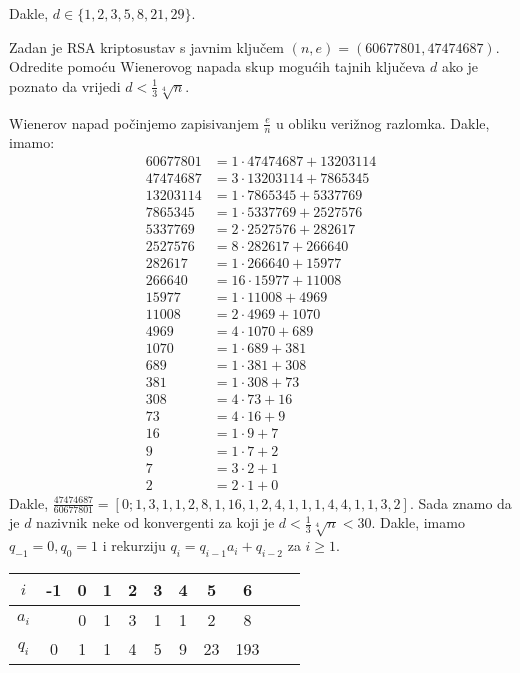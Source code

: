 \documentclass{exam}
\begin{document}
\begin{questions}
\begin{solution}
  Dakle, $d \in \{1, 2, 3, 5, 8, 21, 29\}$.
\end{solution}

\pagebreak

\question Zadan je RSA kriptosustav s javnim ključem $(n, e) = (60677801, 47474687)$. Odredite pomoću Wienerovog napada skup mogućih tajnih ključeva $d$ ako je poznato da vrijedi $d < \frac{1}{3} \sqrt[4]{n}$.

\begin{solution}
  Wienerov napad počinjemo zapisivanjem $\frac{e}{n}$ u obliku verižnog razlomka. Dakle, imamo:
  \begin{align*}
    60677801 &= 1 \cdot 47474687 + 13203114\\
    47474687 &= 3 \cdot 13203114 + 7865345\\
    13203114 &= 1 \cdot 7865345 + 5337769\\
    7865345 &= 1 \cdot 5337769 + 2527576\\
    5337769 &= 2 \cdot 2527576 + 282617\\
    2527576 &= 8 \cdot 282617 + 266640\\
    282617 &= 1 \cdot 266640 + 15977\\
    266640 &= 16 \cdot 15977 + 11008\\
    15977 &= 1 \cdot 11008 + 4969\\
    11008 &= 2 \cdot 4969 + 1070\\
    4969 &= 4 \cdot 1070 + 689\\
    1070 &= 1 \cdot 689 + 381\\
    689 &= 1 \cdot 381 + 308\\
    381 &= 1 \cdot 308 + 73\\
    308 &= 4 \cdot 73 + 16\\
    73 &= 4 \cdot 16 + 9\\
    16 &= 1 \cdot 9 + 7\\
    9 &= 1 \cdot 7 + 2\\
    7 &= 3 \cdot 2 + 1\\
    2 &= 2 \cdot 1 + 0
  \end{align*}
  Dakle, $\frac{47474687}{60677801} = [0; 1, 3, 1, 1, 2, 8, 1, 16, 1, 2, 4, 1, 1, 1, 4, 4, 1, 1, 3, 2]$. Sada znamo da je $d$ nazivnik neke od konvergenti za koji je $d < \frac{1}{3} \sqrt[4]{n} < 30$. Dakle, imamo $q_{-1} = 0, q_{0} = 1$ i rekurziju $q_i = q_{i-1} a_i + q_{i-2}$ za $i \geq 1$.

  \begin{tabular}{|c|c|c|c|c|c|c|c|c|c|c|}
    \hline
    $i$ & -1 & 0 & 1 & 2 & 3 & 4 & 5 & 6\\
    \hline
    $a_i$ & & 0 & 1 & 3 & 1 & 1 & 2 & 8\\
    \hline
    $q_i$ & 0 & 1 & 1 & 4 & 5 & 9 & 23 & 193\\
    \hline
  \end{tabular}


\end{solution}
\end{questions}
\end{document}
